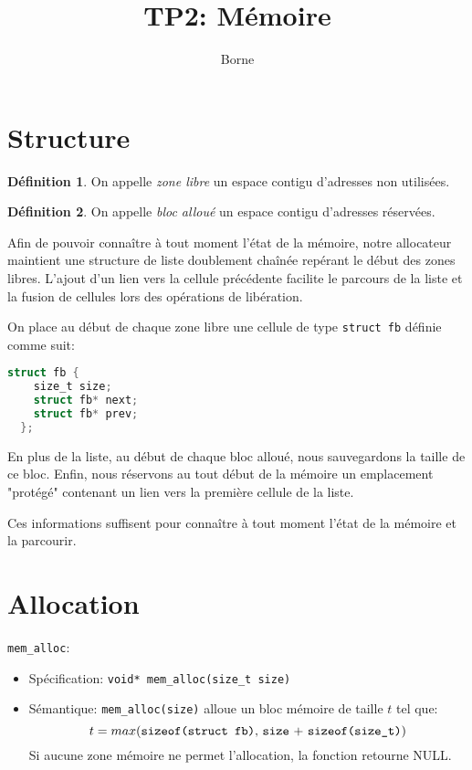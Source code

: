 \documentclass[11pt]{article}
\author{Borne}
\date{}
\title{TP2: Mémoire}
\theoremstyle{definition}
\newtheorem*{mydef}{Définition}
\begin{document}
\maketitle
\section{Structure}

\begin{mydef} On appelle \textit{zone libre} un espace contigu d'adresses non utilisées.
\end{mydef}
\begin{mydef}
 On appelle \textit{bloc alloué} un espace contigu d'adresses réservées.
\end{mydef}
Afin de pouvoir connaître à tout moment l'état de la mémoire, notre allocateur
maintient une structure de liste doublement chaînée repérant le début des zones libres.
L'ajout d'un lien vers la cellule précédente facilite le parcours de la liste et la fusion de cellules lors
des opérations de libération.

On place au début de chaque zone libre une cellule de type \texttt{struct fb} définie comme suit:

\begin{lstlisting}[language=C,columns=fixed,basicstyle=\scriptsize\ttfamily]
  struct fb {
    size_t size;
    struct fb* next;
    struct fb* prev;
  };
\end{lstlisting}

En plus de la liste, au début de chaque bloc alloué, nous sauvegardons la taille de ce bloc.
Enfin, nous réservons au tout début de la mémoire un emplacement "protégé" contenant
un lien vers la première cellule de la liste.

Ces informations suffisent pour connaître à tout moment l'état de la mémoire et la parcourir.

\section{Allocation}
\texttt{mem\_alloc}:
\begin{itemize}
\item[]Spécification: \texttt{void*  mem\_alloc(size\_t size)}
\item[]Sémantique: \texttt{mem\_alloc(size)} alloue un bloc mémoire de taille $t$ tel que:
  $$t = max(\text{\texttt{sizeof(struct fb)}, \texttt{size} + \texttt{sizeof(size\_t)}})$$
  Si aucune zone mémoire ne permet l'allocation, la fonction retourne NULL.
\end{itemize}
\end{document}
